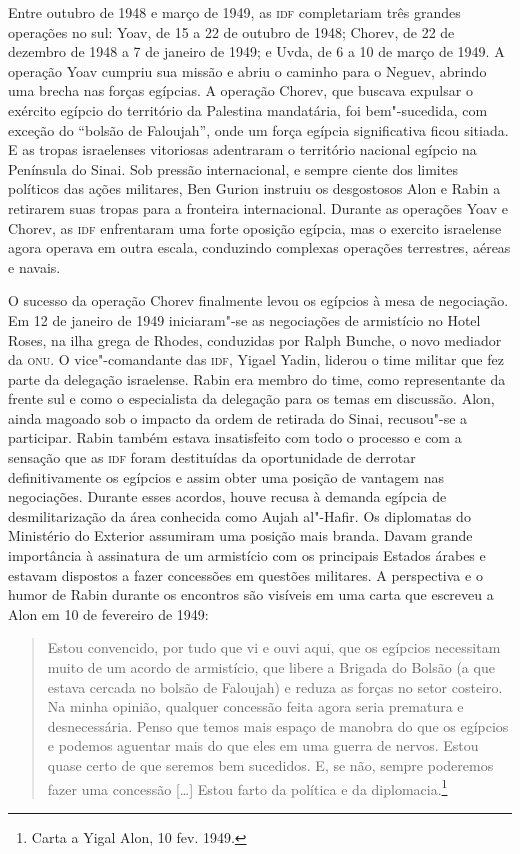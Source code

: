 Entre outubro de 1948 e março de 1949, as \textsc{idf} completariam três grandes
operações no sul: Yoav, de 15 a 22 de outubro de 1948; Chorev, de 22 de
dezembro de 1948 a 7 de janeiro de 1949; e Uvda, de 6 a 10 de março de
1949. A operação Yoav cumpriu sua missão e abriu o caminho para o
Neguev, abrindo uma brecha nas forças egípcias. A operação Chorev, que
buscava expulsar o exército egípcio do território da Palestina
mandatária, foi bem"-sucedida, com exceção do ``bolsão de Faloujah'',
onde um força egípcia significativa ficou sitiada. E as tropas
israelenses vitoriosas adentraram o território nacional egípcio na
Península do Sinai. Sob pressão internacional, e sempre ciente dos
limites políticos das ações militares, Ben Gurion instruiu os
desgostosos Alon e Rabin a retirarem suas tropas para a fronteira
internacional. Durante as operações Yoav e Chorev, as \textsc{idf} enfrentaram
uma forte oposição egípcia, mas o exercito israelense agora operava em
outra escala, conduzindo complexas operações terrestres, aéreas e
navais.

O sucesso da operação Chorev finalmente levou os egípcios à mesa de
negociação. Em 12 de janeiro de 1949 iniciaram"-se as negociações de
armistício no Hotel Roses, na ilha grega de Rhodes, conduzidas por Ralph
Bunche, o novo mediador da \textsc{onu}. O vice"-comandante das \textsc{idf}, Yigael Yadin,
liderou o time militar que fez parte da delegação israelense. Rabin era
membro do time, como representante da frente sul e como o especialista
da delegação para os temas em discussão. Alon, ainda magoado sob o
impacto da ordem de retirada do Sinai, recusou"-se a participar. Rabin
também estava insatisfeito com todo o processo e com a sensação que as
\textsc{idf} foram destituídas da oportunidade de derrotar definitivamente os
egípcios e assim obter uma posição de vantagem nas negociações. Durante
esses acordos, houve recusa à demanda egípcia de desmilitarização da área
conhecida como Aujah al"-Hafir. Os diplomatas do Ministério do Exterior
assumiram uma posição mais branda. Davam grande importância à assinatura
de um armistício com os principais Estados árabes e estavam dispostos a
fazer concessões em questões militares. A perspectiva e o humor de Rabin
durante os encontros são visíveis em uma carta que escreveu a Alon em
10 de fevereiro de 1949:

\begin{quote}
Estou convencido, por tudo que vi e ouvi aqui, que os egípcios
necessitam muito de um acordo de armistício, que libere a Brigada do
Bolsão (a que estava cercada no bolsão de Faloujah) e reduza as forças
no setor costeiro. Na minha opinião, qualquer concessão feita agora
seria prematura e desnecessária. Penso que temos mais espaço de
manobra do que os egípcios e podemos aguentar mais do que eles em uma guerra
de nervos. Estou quase certo de que seremos bem sucedidos. E, se não, sempre
poderemos fazer uma concessão {[}\ldots{}{]} Estou farto da política e da
diplomacia.\footnote{Carta a Yigal Alon, 10 fev. 1949.}
\end{quote}

